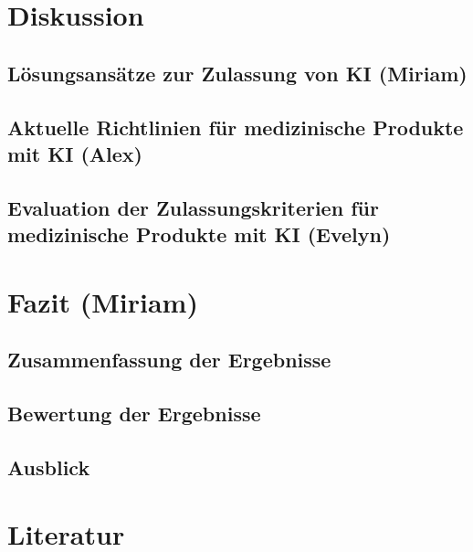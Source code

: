 \documentclass[a4paper, 11pt]{article}
\begin{document}
	\section{Diskussion}\label{sec:discussion}
		
		\subsection{Lösungsansätze zur Zulassung von KI  \small{(Miriam)}} \label{sec:solutions}
			
		\subsection{Aktuelle Richtlinien für medizinische Produkte mit KI \small{(Alex)}}\label{sec:guidlines}
			
		\subsection{Evaluation der Zulassungskriterien für medizinische Produkte mit KI \small{(Evelyn)}}\label{sec:sufficient-criteria}
			
		
	
	\newpage
	\section{Fazit \small{(Miriam)}}\label{sec:conclusion}
		
		\subsection{Zusammenfassung der Ergebnisse}\label{sec:summary}
			
		\subsection{Bewertung der Ergebnisse}\label{sec:rating}
			
		\subsection{Ausblick}\label{sec:perspective}
			
	  

    \newpage
    \printglossary[type=\acronymtype,title={Akronyme}]
   
    \newpage
    \section*{Literatur}
    \nocite{*}
    \printbibliography[heading=bibintoc,type=article, title={Literatur}]
	
    \newpage
    \printglossary[type=main,title={Glossar}]
\end{document}

